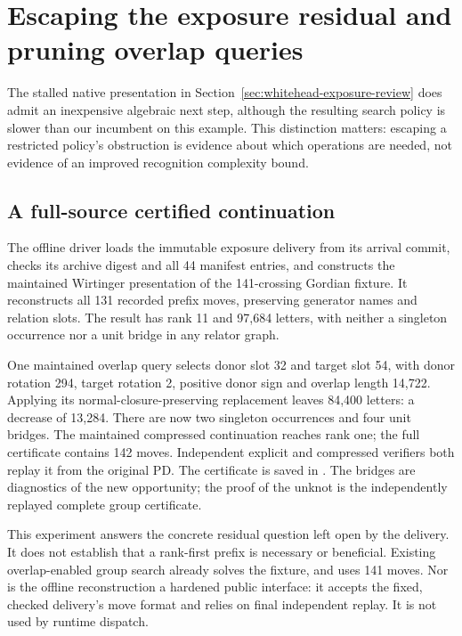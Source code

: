 \section{Escaping the exposure residual and pruning overlap queries}
\label{sec:exposure-residual}

The stalled native presentation in Section~\ref{sec:whitehead-exposure-review}
does admit an inexpensive algebraic next step, although the resulting search
policy is slower than our incumbent on this example. This distinction matters:
escaping a restricted policy's obstruction is evidence about which operations
are needed, not evidence of an improved recognition complexity bound.

\subsection{A full-source certified continuation}

The offline driver  loads
the immutable exposure delivery from its arrival commit, checks its archive
digest and all 44 manifest entries, and constructs the maintained Wirtinger
presentation of the 141-crossing Gordian fixture. It reconstructs all 131
recorded prefix moves, preserving generator names and relation slots. The
result has rank 11 and 97,684 letters, with neither a singleton occurrence
nor a unit bridge in any relator graph.

One maintained overlap query selects donor slot 32 and target slot 54,
with donor rotation 294, target rotation 2, positive donor sign and overlap
length 14,722. Applying its normal-closure-preserving replacement leaves
84,400 letters: a decrease of 13,284. There are now two singleton occurrences
and four unit bridges. The maintained compressed continuation reaches rank
one; the full certificate contains 142 moves. Independent explicit and
compressed verifiers both replay it from the original PD. The certificate
is saved in .
The bridges are diagnostics of the new opportunity; the proof of the unknot
is the independently replayed complete group certificate.

This experiment answers the concrete residual question left open by the
delivery. It does not establish that a rank-first prefix is necessary or
beneficial. Existing overlap-enabled group search already solves the fixture,
and uses 141 moves. Nor is the offline reconstruction a hardened public
interface: it accepts the fixed, checked delivery's move format and relies
on final independent replay. It is not used by runtime dispatch.

